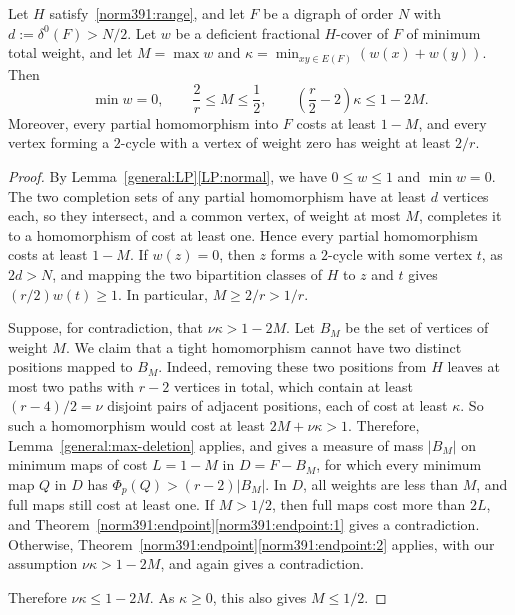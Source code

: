 \begin{theorem}
\label{norm391:normalized-cover}
Let $H$ satisfy~\eqref{norm391:range}, and let $F$ be a digraph of order $N$ with
$d:=\delta^0(F)>N/2$. Let $w$ be a deficient fractional
$H$-cover of $F$ of minimum total weight, and let
$M=\max w$ and $\kappa=\min_{xy\in E(F)}(w(x)+w(y))$.
Then
\[
 \min w=0,\qquad \frac2r\le M\le\frac12,\qquad
 \left(\frac r2-2\right)\kappa\le1-2M.
\]
Moreover, every partial homomorphism into $F$ costs at least $1-M$, and every vertex forming a $2$-cycle with a vertex of weight zero has weight at least $2/r$.
\end{theorem}
\begin{proof}
By Lemma~\ref{general:LP}\ref{LP:normal}, we have $0\le w\le1$ and $\min w=0$.
The two completion sets of any partial homomorphism have at
least $d$ vertices each, so they intersect, and a common vertex, of weight at most
$M$, completes it to a homomorphism of cost at least one. Hence every partial homomorphism costs at least $1-M$.
If $w(z)=0$, then $z$ forms a $2$-cycle with some vertex $t$, as $2d>N$, and mapping the two bipartition classes of $H$ to $z$ and $t$ gives $(r/2)w(t)\ge1$. In particular, $M\ge2/r>1/r$.

Suppose, for contradiction, that $\nu\kappa>1-2M$. Let $B_M$ be the set of vertices of weight $M$.
We claim that a tight homomorphism cannot have two distinct positions mapped to $B_M$. Indeed, removing these two positions from $H$ leaves at most two paths with $r-2$ vertices in total, which contain at least $(r-4)/2=\nu$ disjoint pairs of adjacent positions, each of cost at least $\kappa$. So such a homomorphism would cost at least $2M+\nu\kappa>1$.
Therefore, Lemma~\ref{general:max-deletion} applies, and gives a measure of mass $|B_M|$ on minimum maps of cost $L=1-M$ in $D=F-B_M$, for which every minimum map $Q$ in $D$ has $\Phi_p(Q)>(r-2)|B_M|$.
In $D$, all weights are less than $M$, and full maps still cost at least one.
If $M>1/2$, then full maps cost more than $2L$, and Theorem~\ref{norm391:endpoint}\ref{norm391:endpoint:1} gives a contradiction. Otherwise, Theorem~\ref{norm391:endpoint}\ref{norm391:endpoint:2} applies,
with our assumption $\nu\kappa>1-2M$, and again gives a contradiction.

Therefore $\nu\kappa\le1-2M$. As $\kappa\ge0$, this also gives $M\le1/2$.
\end{proof}
